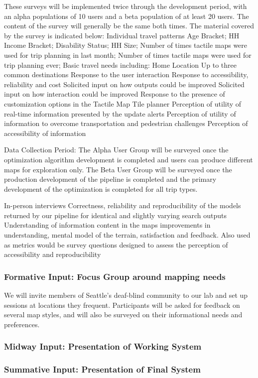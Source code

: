 These surveys will be implemented twice through the development period, with an alpha populations of 10 users and a beta population of at least 20 users.  
The content of the survey will generally be the same both times. The material covered by the survey is indicated below:
Individual travel patterns
 Age Bracket; HH Income Bracket; Disability Status; HH Size; Number of times tactile maps were used for trip planning in last month; Number of times tactile maps were used for trip planning ever; 
 Basic travel needs including:
Home Location
Up to three common destinations
Response to the user interaction
Response to accessibility, reliability and cost 
Solicited input on how outputs could be improved
Solicited input on how interaction could be improved
Response to the presence of customization options in the Tactile Map Tile planner
Perception of utility of real-time information presented by the update alerts
Perception of utility of information to overcome transportation and pedestrian challenges
Perception of accessibility of information 

Data Collection Period:
The Alpha User Group will be surveyed once the optimization algorithm development is completed and users can produce different maps for exploration only.
The Beta User Group will be surveyed once the production development of the pipeline is completed and the primary development of the optimization is completed for all trip types.

\ac{

In-person interviews
Correctness, reliability and reproducibility of the models returned by our pipeline for identical and slightly varying search outputs
Understanding of information content in the maps
improvements in understanding, mental model of the terrain, satisfaction and feedback. Also used as metrics would be survey questions designed to assess the perception of accessibility and reproducibility
}
\subsubsection{Formative Input: Focus Group around mapping needs}

We will invite members of Seattle’s deaf-blind community to our lab and set up sessions at locations they frequent. Participants will be asked for feedback on several map styles, and will also be surveyed on their informational needs and preferences.  

\subsubsection{Midway Input: Presentation of Working System}


\subsubsection{Summative Input: Presentation of Final System}

